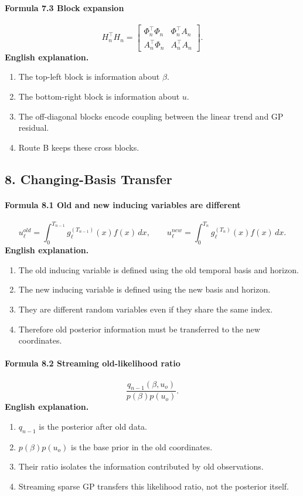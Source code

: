 \documentclass[12pt]{article}
\begin{document}
\paragraph{Formula 7.3 Block expansion}
\[
H_n^\top H_n
=
\begin{bmatrix}
\Phi_n^\top\Phi_n & \Phi_n^\top A_n\\
A_n^\top\Phi_n & A_n^\top A_n
\end{bmatrix}.
\]
\textbf{English explanation.}
\begin{enumerate}[leftmargin=2em]
\item The top-left block is information about \(\beta\).
\item The bottom-right block is information about \(u\).
\item The off-diagonal blocks encode coupling between the linear trend and GP residual.
\item Route B keeps these cross blocks.
\end{enumerate}

\subsection{8. Changing-Basis Transfer}
\paragraph{Formula 8.1 Old and new inducing variables are different}
\[
u_\ell^{old}=\int_0^{T_{n-1}}g_\ell^{(T_{n-1})}(x)f(x)\,dx,
\qquad
u_\ell^{new}=\int_0^{T_n}g_\ell^{(T_n)}(x)f(x)\,dx.
\]
\textbf{English explanation.}
\begin{enumerate}[leftmargin=2em]
\item The old inducing variable is defined using the old temporal basis and horizon.
\item The new inducing variable is defined using the new basis and horizon.
\item They are different random variables even if they share the same index.
\item Therefore old posterior information must be transferred to the new coordinates.
\end{enumerate}

\paragraph{Formula 8.2 Streaming old-likelihood ratio}
\[
\frac{q_{n-1}(\beta,u_o)}{p(\beta)p(u_o)}.
\]
\textbf{English explanation.}
\begin{enumerate}[leftmargin=2em]
\item \(q_{n-1}\) is the posterior after old data.
\item \(p(\beta)p(u_o)\) is the base prior in the old coordinates.
\item Their ratio isolates the information contributed by old observations.
\item Streaming sparse GP transfers this likelihood ratio, not the posterior itself.
\end{enumerate}
\end{document}
